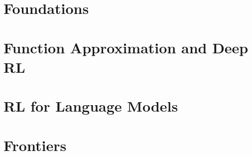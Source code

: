 \documentclass[oneside,openany]{book}
\theoremstyle{definition}
\theoremstyle{plain}
\theoremstyle{remark}
\begin{document}
\part{Foundations}

\part{Function Approximation and Deep RL}

\part{RL for Language Models}

\part{Frontiers}

\appendix


\backmatter




% 

\printindex
\end{document}
